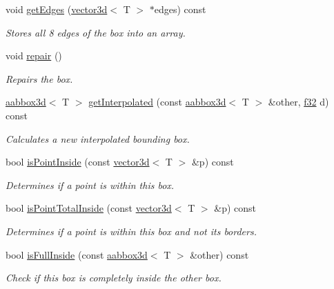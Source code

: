 \begin{DoxyCompactItemize}
void \hyperlink{classirr_1_1core_1_1aabbox3d_acb31d9c6a79559c2636c1e32a3e2e459}{get\+Edges} (\hyperlink{classirr_1_1core_1_1vector3d}{vector3d}$<$ T $>$ $\ast$edges) const
\begin{DoxyCompactList}\small\item\em Stores all 8 edges of the box into an array. \end{DoxyCompactList}\item 
void \hyperlink{classirr_1_1core_1_1aabbox3d_a904b14e6b6a99187820a7407b5d7cf23}{repair} ()
\begin{DoxyCompactList}\small\item\em Repairs the box. \end{DoxyCompactList}\item 
\hyperlink{classirr_1_1core_1_1aabbox3d}{aabbox3d}$<$ T $>$ \hyperlink{classirr_1_1core_1_1aabbox3d_a2c2073f3693819d99906f2ae36dd19de}{get\+Interpolated} (const \hyperlink{classirr_1_1core_1_1aabbox3d}{aabbox3d}$<$ T $>$ \&other, \hyperlink{namespaceirr_a0277be98d67dc26ff93b1a6a1d086b07}{f32} d) const
\begin{DoxyCompactList}\small\item\em Calculates a new interpolated bounding box. \end{DoxyCompactList}\item 
bool \hyperlink{classirr_1_1core_1_1aabbox3d_ae69d28e1e512f705a6cbf95c5829f6cd}{is\+Point\+Inside} (const \hyperlink{classirr_1_1core_1_1vector3d}{vector3d}$<$ T $>$ \&p) const
\begin{DoxyCompactList}\small\item\em Determines if a point is within this box. \end{DoxyCompactList}\item 
bool \hyperlink{classirr_1_1core_1_1aabbox3d_a0be7a03228c7af1e6c563acea4af316e}{is\+Point\+Total\+Inside} (const \hyperlink{classirr_1_1core_1_1vector3d}{vector3d}$<$ T $>$ \&p) const
\begin{DoxyCompactList}\small\item\em Determines if a point is within this box and not its borders. \end{DoxyCompactList}\item 
bool \hyperlink{classirr_1_1core_1_1aabbox3d_a81be1b0ba25d5adff30182ce0f9670ab}{is\+Full\+Inside} (const \hyperlink{classirr_1_1core_1_1aabbox3d}{aabbox3d}$<$ T $>$ \&other) const
\begin{DoxyCompactList}\small\item\em Check if this box is completely inside the \textquotesingle{}other\textquotesingle{} box. \end{DoxyCompactList}\item 

\end{DoxyCompactItemize}
